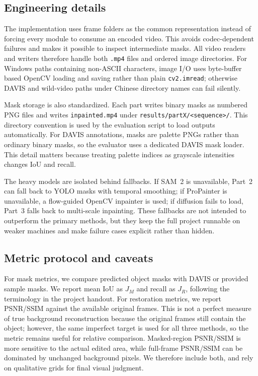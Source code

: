 \documentclass[10pt,twocolumn,letterpaper]{article}
\begin{document}
\subsection{Engineering details}
The implementation uses frame folders as the common representation instead of forcing every module to consume an encoded video. This avoids codec-dependent failures and makes it possible to inspect intermediate masks. All video readers and writers therefore handle both \texttt{.mp4} files and ordered image directories. For Windows paths containing non-ASCII characters, image I/O uses byte-buffer based OpenCV loading and saving rather than plain \texttt{cv2.imread}; otherwise DAVIS and wild-video paths under Chinese directory names can fail silently.

Mask storage is also standardized. Each part writes binary masks as numbered PNG files and writes \texttt{inpainted.mp4} under \texttt{results/partX/<sequence>/}. This directory convention is used by the evaluation script to load outputs automatically. For DAVIS annotations, masks are palette PNGs rather than ordinary binary masks, so the evaluator uses a dedicated DAVIS mask loader. This detail matters because treating palette indices as grayscale intensities changes IoU and recall.

The heavy models are isolated behind fallbacks. If SAM~2 is unavailable, Part~2 can fall back to YOLO masks with temporal smoothing; if ProPainter is unavailable, a flow-guided OpenCV inpainter is used; if diffusion fails to load, Part~3 falls back to multi-scale inpainting. These fallbacks are not intended to outperform the primary methods, but they keep the full project runnable on weaker machines and make failure cases explicit rather than hidden.

\subsection{Metric protocol and caveats}
For mask metrics, we compare predicted object masks with DAVIS or provided sample masks. We report mean IoU as $J_M$ and recall as $J_R$, following the terminology in the project handout. For restoration metrics, we report PSNR/SSIM against the available original frames. This is not a perfect measure of true background reconstruction because the original frames still contain the object; however, the same imperfect target is used for all three methods, so the metric remains useful for relative comparison. Masked-region PSNR/SSIM is more sensitive to the actual edited area, while full-frame PSNR/SSIM can be dominated by unchanged background pixels. We therefore include both, and rely on qualitative grids for final visual judgment.
\end{document}
